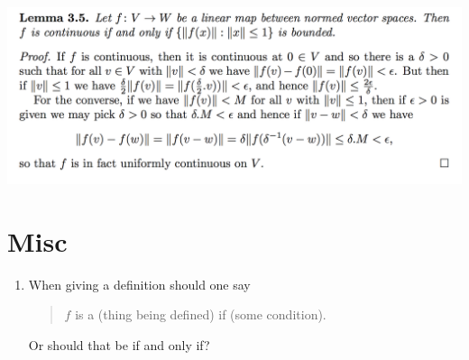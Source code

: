 \documentclass[12pt]{article}
\begin{document}
\begin{enumerate}
  \begin{mdframed}
    \includegraphics[width=400pt]{img/questions-oxford-a2-linear-transformation-continuity.png}
  \end{mdframed}
\end{enumerate}

\section*{Misc}
\begin{enumerate}
\item When giving a definition should one say
  \begin{quote}
    $f$ is a (thing being defined) if (some condition).
  \end{quote}
  Or should that be if and only if?
\end{enumerate}
\end{document}
